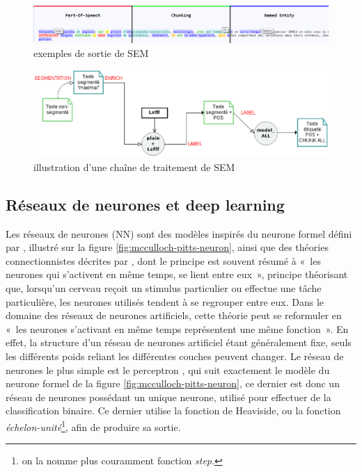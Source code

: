 \documentclass[12pt,a4paper,times,twoside,openright]{report}
\begin{document}
\begin{figure}[ht!]
\centering
\includegraphics[scale=0.5]{images/SEM/html-example}
\caption{exemples de sortie de SEM}
\label{fig:sem-html}
\end{figure}

\begin{figure}[ht!]
\centering
\includegraphics[scale=0.5]{images/SEM/pipeline-example}
\caption{illustration d'une chaîne de traitement de SEM}
\label{fig:sem-pipeline-showcase}
\end{figure}


        
        \subsection{Réseaux de neurones et deep learning}
        \label{subsec:NNs}
Les réseaux de neurones (NN) sont des modèles inspirés du neurone formel défini par \citet{mcculloch1943logical}, illustré sur la figure \ref{fig:mcculloch-pitts-neuron}, ainsi que des théories connectionnistes décrites par \citet{hebb1949organisation}, dont le principe est souvent résumé à «\ les neurones qui s'activent en même temps, se lient entre eux\ », principe théorisant que, lorsqu'un cerveau reçoit un stimulus particulier ou effectue une tâche particulière, les neurones utilisés tendent à se regrouper entre eux. Dans le domaine des réseaux de neurones artificiels, cette théorie peut se reformuler en «\ les neurones s'activant en même temps représentent une même fonction\ ». En effet, la structure d'un réseau de neurones artificiel étant généralement fixe, seuls les différents poids reliant les différentes couches peuvent changer. Le réseau de neurones le plus simple est le perceptron \citep{rosenblatt1958perceptron}, qui suit exactement le modèle du neurone formel de la figure \ref{fig:mcculloch-pitts-neuron}, ce dernier est donc un réseau de neurones possédant un unique neurone, utilisé pour effectuer de la classification binaire. Ce dernier utilise la fonction de Heaviside, ou la fonction \emph{échelon-unité}\footnote{on la nomme plus couramment fonction \emph{step}.}, afin de produire sa sortie.
\end{document}
